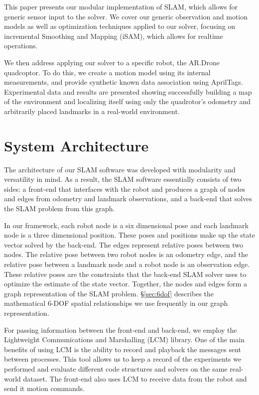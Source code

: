 \documentclass[conference]{IEEEtran}
\begin{document}
This paper presents our modular implementation of SLAM, which allows for generic sensor
input to the solver.  We cover our generic observation and motion models as well as
optimization techniques applied to our solver, focusing on incremental Smoothing and
Mapping (iSAM), which allows for realtime operations. \cite{Kaess08tro}

We then address applying our solver to a specific robot, the AR.Drone quadcoptor.  To do
this, we create a motion model using its internal measurements, and provide synthetic
known data association using AprilTags. \cite{olson2011tags} Experimental data and results are presented
showing successfully building a map of the environment and localizing itself using only
the quadrotor's odometry and arbitrarily placed landmarks in a real-world environment.

\section{System Architecture}
\label{sec:systemarchitecture}


The architecture of our SLAM software was developed with modularity and versatility in
mind.  As a result, the SLAM software essentially consists of two sides: a front-end that
interfaces with the robot and produces a graph of nodes and edges from odometry and
landmark observations, and a back-end that solves the SLAM problem from this graph.

In our framework, each robot node is a six dimensional pose and each landmark node is a
three dimensional position. These poses and positions make up the state vector solved by
the back-end.  The edges represent relative poses between two nodes. The relative pose
between two robot nodes is an odometry edge, and the relative pose between a landmark node
and a robot node is an observation edge. These relative poses are the constraints that the
back-end SLAM solver uses to optimize the estimate of the state vector. Together, the
nodes and edges form a graph representation of the SLAM problem.  \S\ref{sec:6dof}
describes the mathematical 6-DOF spatial relationships we use frequently in our graph
representation.


For passing information between the front-end and back-end, we employ the Lightweight
Communications and Marshalling (LCM) library. \cite{huang2010} One of the main benefits
of using LCM is the ability to record and playback the messages sent between processes. This
tool allows us to keep a record of the experiments we performed and evaluate different code 
structures and solvers on the same real-world dataset. The front-end also uses LCM
to receive data from the robot and send it motion commands.
\end{document}
